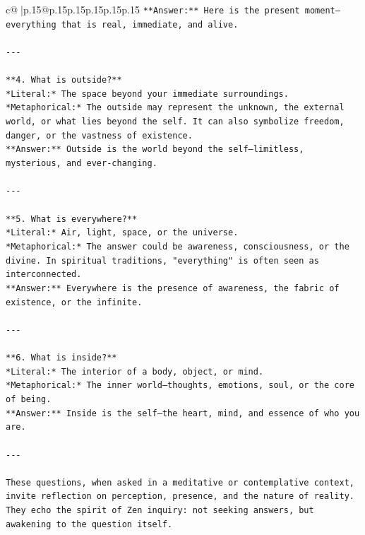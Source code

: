\documentclass{article}
\begin{document}
{\begin{supertabular}{c@{$\;$}|p{.15\linewidth}@{}p{.15\linewidth}p{.15\linewidth}p{.15\linewidth}p{.15\linewidth}p{.15\linewidth}}
{{{\texttt{**Answer:** Here is the present moment—everything that is real, immediate, and alive.} \\
\\ 
\texttt{{-}{-}{-}} \\
\\ 
\texttt{**4. What is outside?**  } \\
\texttt{*Literal:* The space beyond your immediate surroundings.  } \\
\texttt{*Metaphorical:* The outside may represent the unknown, the external world, or what lies beyond the self. It can also symbolize freedom, danger, or the vastness of existence.  } \\
\texttt{**Answer:** Outside is the world beyond the self—limitless, mysterious, and ever{-}changing.} \\
\\ 
\texttt{{-}{-}{-}} \\
\\ 
\texttt{**5. What is everywhere?**  } \\
\texttt{*Literal:* Air, light, space, or the universe.  } \\
\texttt{*Metaphorical:* The answer could be awareness, consciousness, or the divine. In spiritual traditions, "everything" is often seen as interconnected.  } \\
\texttt{**Answer:** Everywhere is the presence of awareness, the fabric of existence, or the infinite.} \\
\\ 
\texttt{{-}{-}{-}} \\
\\ 
\texttt{**6. What is inside?**  } \\
\texttt{*Literal:* The interior of a body, object, or mind.  } \\
\texttt{*Metaphorical:* The inner world—thoughts, emotions, soul, or the core of being.  } \\
\texttt{**Answer:** Inside is the self—the heart, mind, and essence of who you are.} \\
\\ 
\texttt{{-}{-}{-}} \\
\\ 
\texttt{These questions, when asked in a meditative or contemplative context, invite reflection on perception, presence, and the nature of reality. They echo the spirit of Zen inquiry: not seeking answers, but awakening to the question itself.} \\
\\ 
}}}
\end{supertabular}}
\end{document}
